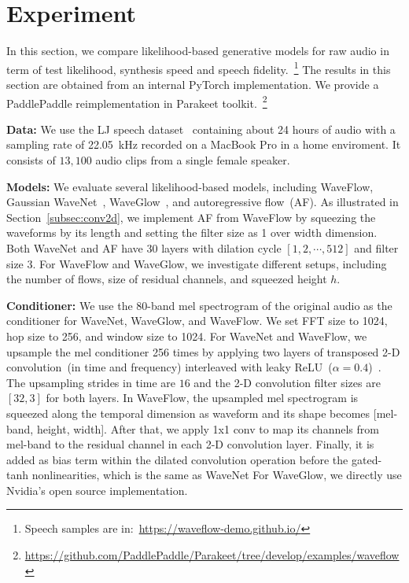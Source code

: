\documentclass{article}
\begin{document}
\section{Experiment}
\label{sec:experiment}
In this section, we compare likelihood-based generative models for raw audio in term of test likelihood, synthesis speed and speech fidelity.~\footnote{\small{Speech samples are in:~\url{https://waveflow-demo.github.io/}}}
The results in this section are obtained from an internal PyTorch implementation. We provide a PaddlePaddle reimplementation in Parakeet toolkit.~\footnote{\small{\url{https://github.com/PaddlePaddle/Parakeet/tree/develop/examples/waveflow}}}

\vspace{-.3em}
{\bf Data:} We use the LJ speech dataset~\citep{Ito2017ljspeech} containing about 24 hours of audio with a sampling rate of 22.05~kHz recorded on a MacBook Pro in a home enviroment.
It consists of $13,100$ audio clips from a single female speaker.

\vspace{-.3em}
{\bf Models:}
We evaluate several likelihood-based models, including WaveFlow,  Gaussian WaveNet~\citep{ping2018clarinet}, WaveGlow~\citep{prenger2019waveglow}, and autoregressive flow~(AF). 
As illustrated in Section~\ref{subsec:conv2d}, we implement AF from WaveFlow by squeezing the waveforms by its length and setting the filter size as 1 over width dimension.
Both WaveNet and AF have 30 layers with dilation cycle $[1, 2, \cdots, 512]$ and filter size 3.
For WaveFlow and WaveGlow, we investigate different setups, including the number of flows, size of residual channels, and squeezed height $h$.

\vspace{-.3em}
{\bf Conditioner:}
We use the 80-band mel spectrogram of the original audio as the conditioner for WaveNet, WaveGlow, and WaveFlow.
We set FFT size to 1024, hop size to 256, and window size to 1024.
For WaveNet and WaveFlow, we upsample the mel conditioner 256 times by applying two layers of transposed 2-D convolution~(in time and frequency) interleaved with leaky ReLU~($\alpha=0.4$)~\citep{ping2018clarinet}.
The upsampling strides in time are $16$ and the 2-D convolution filter sizes are $[32, 3]$ for both layers.
In WaveFlow, the upsampled mel spectrogram is squeezed along the temporal dimension as waveform and its shape becomes [mel-band, height, width]. After that, we apply 1x1 conv to map its channels from mel-band to the residual channel in each 2-D convolution layer. Finally, it is added as bias term within the dilated convolution operation before the gated-tanh nonlinearities, which is the same as WaveNet
For WaveGlow, we directly use Nvidia's open source implementation.
\end{document}
